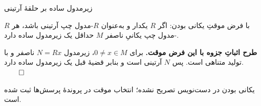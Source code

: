 \begin{frame}[t]{زیرمدول ساده بر حلقهٔ آرتینی}
    \label{lec11:left-artinian-simple-pending}
    \begin{tblock}{با فرض موقتِ یکانی بودن: }
        اگر $R$ یکدار و به‌عنوان $R$-مدول چپ آرتینی باشد، هر $R$-مدول چپ
        یکانیِ ناصفر $M$ حداقل یک زیرمدول ساده دارد.
    \end{tblock}
    \textbf{طرح اثباتِ جزوه با این فرض موقت.}
    برای $0\ne x\in M$، زیرمدول $N=Rx$ ناصفر و با تولید متناهی است.
    پس $N$ آرتینی است و بنابر قضیهٔ قبل یک زیرمدول ساده دارد.
    \hfill\(\qed\)

    \medskip
    یکانی بودن در دست‌نویس تصریح نشده؛ انتخاب موقت در پروندهٔ پرسش‌ها ثبت شده است.
\end{frame}
